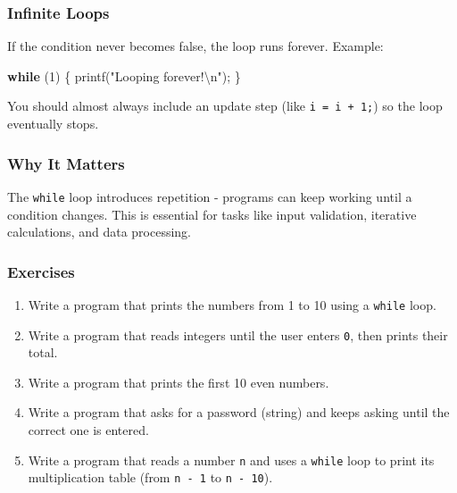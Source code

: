 \documentclass[
  letterpaper,
  DIV=11,
  numbers=noendperiod]{scrreprt}
\newenvironment{Shaded}{\begin{snugshade}}{\end{snugshade}}
\newcommand{\ControlFlowTok}[1]{\textcolor[rgb]{0.00,0.23,0.31}{\textbf{#1}}}
\newcommand{\DecValTok}[1]{\textcolor[rgb]{0.68,0.00,0.00}{#1}}
\newcommand{\NormalTok}[1]{\textcolor[rgb]{0.00,0.23,0.31}{#1}}
\newcommand{\OperatorTok}[1]{\textcolor[rgb]{0.37,0.37,0.37}{#1}}
\newcommand{\SpecialCharTok}[1]{\textcolor[rgb]{0.37,0.37,0.37}{#1}}
\newcommand{\StringTok}[1]{\textcolor[rgb]{0.13,0.47,0.30}{#1}}
\providecommand{\tightlist}{%
  \setlength{\itemsep}{0pt}\setlength{\parskip}{0pt}}
\begin{document}
\subsubsection{Infinite Loops}\label{infinite-loops}

If the condition never becomes false, the loop runs forever. Example:

\begin{Shaded}
\begin{Highlighting}[]
\ControlFlowTok{while} \OperatorTok{(}\DecValTok{1}\OperatorTok{)} \OperatorTok{\{}
\NormalTok{    printf}\OperatorTok{(}\StringTok{"Looping forever!}\SpecialCharTok{\textbackslash{}n}\StringTok{"}\OperatorTok{);}
\OperatorTok{\}}
\end{Highlighting}
\end{Shaded}

You should almost always include an update step (like
\texttt{i\ =\ i\ +\ 1;}) so the loop eventually stops.

\subsubsection{Why It Matters}\label{why-it-matters-16}

The \texttt{while} loop introduces repetition - programs can keep
working until a condition changes. This is essential for tasks like
input validation, iterative calculations, and data processing.

\subsubsection{Exercises}\label{exercises-17}

\begin{enumerate}
\def\labelenumi{\arabic{enumi}.}
\tightlist
\item
  Write a program that prints the numbers from 1 to 10 using a
  \texttt{while} loop.
\item
  Write a program that reads integers until the user enters \texttt{0},
  then prints their total.
\item
  Write a program that prints the first 10 even numbers.
\item
  Write a program that asks for a password (string) and keeps asking
  until the correct one is entered.
\item
  Write a program that reads a number \texttt{n} and uses a
  \texttt{while} loop to print its multiplication table (from
  \texttt{n\ -\ 1} to \texttt{n\ -\ 10}).
\end{enumerate}
\end{document}
